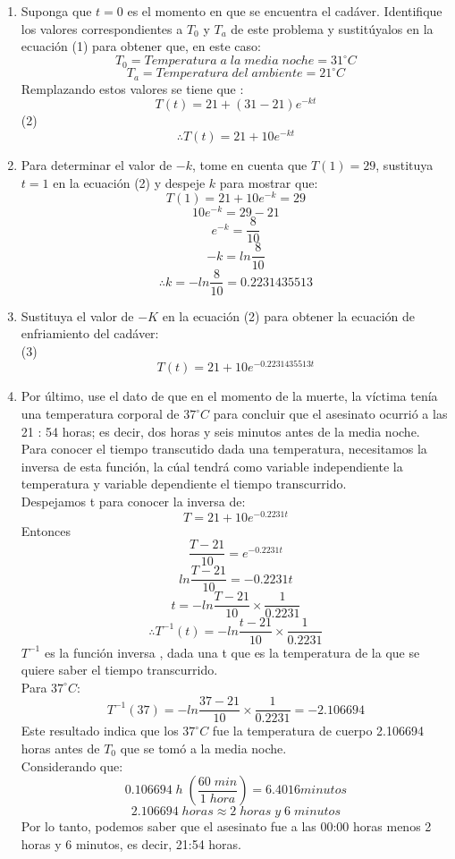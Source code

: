 \documentclass[12pt]{article}
\begin{document}
\begin{enumerate}
\item Suponga que $t = 0$ es el momento en que se encuentra el cadáver. Identifique los valores
correspondientes a $T_0$ y $T_a$ de este problema y sustitúyalos en la ecuación (1) para obtener
que, en este caso:
\[
T_0 = Temperatura \;a \;la\; media \;noche= 31  ^{\circ} C
\]
\[
T_a = Temperatura \;del \;ambiente = 21 ^{\circ}  C
\]
Remplazando estos valores se tiene que : 
\[
T(t)= 21 + (31-21)e^{-kt}
\]
(2)
\[
\therefore  T(t)= 21 + 10e^{-kt}
\]  
\item Para determinar el valor de $-k$, tome en cuenta que $T(1) = 29$, sustituya $t = 1$ en la ecuación (2) y despeje $k$ para mostrar que:
\[
 T(1)= 21 + 10e^{-k} = 29
\]  
\[
 10e^{-k} = 29-21
\]  
\[
  e^{-k} = \frac{8}{10}
\]  
\[
 -k = ln\frac{8}{10}
\]  
\[
 \therefore  k = -ln\frac{8}{10} = 0.2231435513
\] 
\item Sustituya el valor de $-K$ en la ecuación (2) para obtener la ecuación de enfriamiento del
cadáver:\\
(3)
\[
T(t)= 21 + 10e^{-0.2231435513t}
\] 
\item Por último, use el dato de que en el momento de la muerte, la víctima tenía una temperatura
corporal de $37  ^{\circ} C$ para concluir que el asesinato ocurrió a las 21 : 54 horas; es decir, dos horas y seis minutos antes de la media noche.
\\
Para conocer el tiempo transcutido dada una temperatura, necesitamos la inversa de esta función, la cúal tendrá como variable independiente la temperatura y variable dependiente el tiempo transcurrido. \\
Despejamos t para conocer la inversa de: 
\[
T= 21 + 10e^{-0.2231t}
\] 
Entonces
\[
\frac{T-21}{10}= e^{-0.2231t}
\] 
\[
ln \frac{T-21}{10}= -0.2231t
\] 
\[
t = -ln \frac{T-21}{10} \times \frac{1}{0.2231}
\]
\[
\therefore T^{-1}(t) = -ln \frac{t-21}{10} \times \frac{1}{0.2231}
\]
$T^{-1}$ es la función inversa , dada una t que es la temperatura de la que se quiere saber el tiempo transcurrido.\\
Para  $37  ^{\circ} C$:
\[
T^{-1}(37) = -ln \frac{37-21}{10} \times \frac{1}{0.2231} = -2.106694
\]
Este resultado indica que los $37  ^{\circ} C$ fue la temperatura de cuerpo 2.106694 horas antes de $T_0$ que se tomó a la media noche.\\
Considerando que:
\[
	0.106694\;h \;(\frac{60 \; min}{1\; hora}) = 6.4016 minutos
\]
\[
2.106694 \; horas \approx 2 \;horas \;y \;6 \;minutos
\]
Por lo tanto, podemos saber que el asesinato fue a las 00:00 horas menos 2 horas y 6 minutos, es decir, 21:54 horas.
\end{enumerate}
\end{document}
